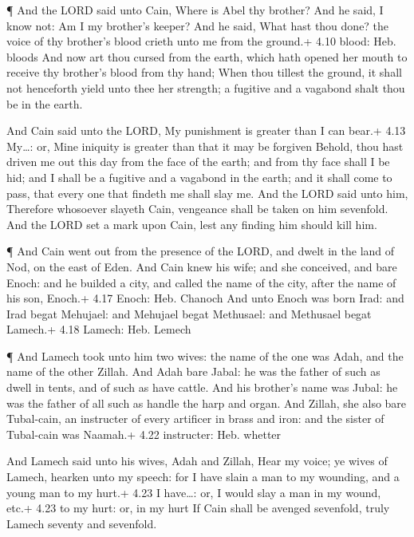  ¶ And the LORD said unto Cain, Where is Abel thy brother?
And he said, I know not: Am I my brother's keeper?  And he
said, What hast thou done? the voice of thy brother's blood crieth unto
me from the ground.+ 4.10 blood: Heb. bloods  And now art
thou cursed from the earth, which hath opened her mouth to receive thy
brother's blood from thy hand;  When thou tillest the
ground, it shall not henceforth yield unto thee her strength; a fugitive
and a vagabond shalt thou be in the earth.

 And Cain said unto the LORD, My punishment is greater than
I can bear.+ 4.13 My\ldots: or, Mine iniquity is greater than that it
may be forgiven  Behold, thou hast driven me out this day
from the face of the earth; and from thy face shall I be hid; and I
shall be a fugitive and a vagabond in the earth; and it shall come to
pass, that every one that findeth me shall slay me.  And
the LORD said unto him, Therefore whosoever slayeth Cain, vengeance
shall be taken on him sevenfold. And the LORD set a mark upon Cain, lest
any finding him should kill him.

 ¶ And Cain went out from the presence of the LORD, and
dwelt in the land of Nod, on the east of Eden.  And Cain
knew his wife; and she conceived, and bare Enoch: and he builded a city,
and called the name of the city, after the name of his son, Enoch.+ 4.17
Enoch: Heb. Chanoch  And unto Enoch was born Irad: and Irad
begat Mehujael: and Mehujael begat Methusael: and Methusael begat
Lamech.+ 4.18 Lamech: Heb. Lemech

 ¶ And Lamech took unto him two wives: the name of the one
was Adah, and the name of the other Zillah.  And Adah bare
Jabal: he was the father of such as dwell in tents, and of such as have
cattle.  And his brother's name was Jubal: he was the
father of all such as handle the harp and organ.  And
Zillah, she also bare Tubal-cain, an instructer of every artificer in
brass and iron: and the sister of Tubal-cain was Naamah.+ 4.22
instructer: Heb. whetter

 And Lamech said unto his wives, Adah and Zillah, Hear my
voice; ye wives of Lamech, hearken unto my speech: for I have slain a
man to my wounding, and a young man to my hurt.+ 4.23 I have\ldots: or,
I would slay a man in my wound, etc.+ 4.23 to my hurt: or, in my hurt
 If Cain shall be avenged sevenfold, truly Lamech seventy
and sevenfold.

